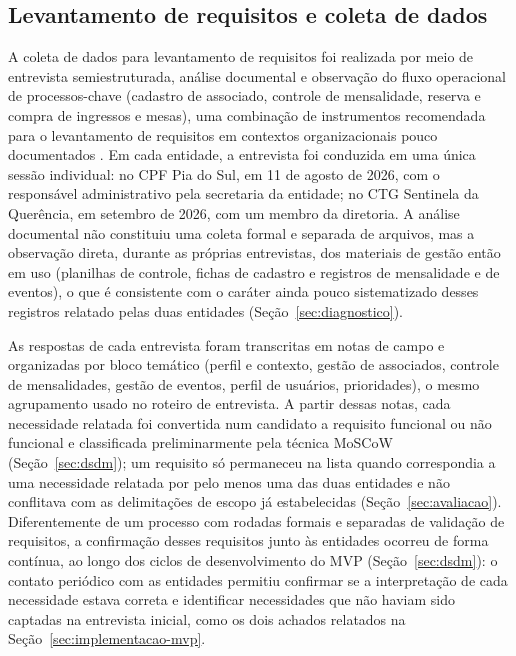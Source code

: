 \documentclass[12pt,a4paper]{article}
\begin{document}
\subsection{Levantamento de requisitos e coleta de dados}
\label{sec:levantamento}

A coleta de dados para levantamento de requisitos foi realizada por meio de entrevista
semiestruturada, análise documental e observação do fluxo operacional de processos-chave (cadastro de
associado, controle de mensalidade, reserva e compra de ingressos e mesas), uma combinação de
instrumentos recomendada para o levantamento de requisitos em contextos organizacionais pouco
documentados \parencite{lakatosMarconi2017}. Em cada entidade, a entrevista foi conduzida em uma
única sessão individual: no CPF Pia do Sul, em 11 de agosto de 2026, com o responsável administrativo
pela secretaria da entidade; no CTG Sentinela da Querência, em setembro de 2026, com um membro da
diretoria. A análise documental não constituiu uma coleta formal e separada de arquivos, mas a
observação direta, durante as próprias entrevistas, dos materiais de gestão então em uso (planilhas de
controle, fichas de cadastro e registros de mensalidade e de eventos), o que é consistente com o
caráter ainda pouco sistematizado desses registros relatado pelas duas entidades
(Seção~\ref{sec:diagnostico}).

As respostas de cada entrevista foram transcritas em notas de campo e organizadas por bloco temático
(perfil e contexto, gestão de associados, controle de mensalidades, gestão de eventos, perfil de
usuários, prioridades), o mesmo agrupamento usado no roteiro de entrevista. A partir dessas notas,
cada necessidade relatada foi convertida num candidato a requisito funcional ou não funcional e
classificada preliminarmente pela técnica MoSCoW (Seção~\ref{sec:dsdm}); um requisito só permaneceu na
lista quando correspondia a uma necessidade relatada por pelo menos uma das duas entidades e não
conflitava com as delimitações de escopo já estabelecidas (Seção~\ref{sec:avaliacao}). Diferentemente
de um processo com rodadas formais e separadas de validação de requisitos, a confirmação desses
requisitos junto às entidades ocorreu de forma contínua, ao longo dos ciclos de desenvolvimento do
MVP (Seção~\ref{sec:dsdm}): o contato periódico com as entidades permitiu confirmar se a interpretação
de cada necessidade estava correta e identificar necessidades que não haviam sido captadas na
entrevista inicial, como os dois achados relatados na Seção~\ref{sec:implementacao-mvp}.
\end{document}
